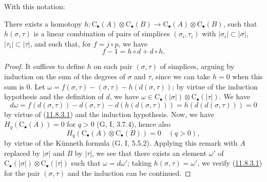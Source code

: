 With this notation:
\begin{proposition}[11.8.3]
\label{0.11.8.3}
{There exists a homotopy $h:\mathrm C_\bullet(A)\otimes\mathrm C_\bullet(B)\longrightarrow\mathrm C_\bullet(A)\otimes\mathrm C_\bullet(B)$,
such that $h(\sigma,\tau)$ is a linear combination of pairs of simplices
$(\sigma_i,\tau_i)$ with $|\sigma_i|\subset|\sigma|$,
$|\tau_i|\subset|\tau|$, and such that, for $f=j\circ p$, we have}
\[
\label{0.11.8.3.1}
\tag{11.8.3.1}
f-1=h\circ d+d\circ h.
\]
\end{proposition}

\begin{proof}
It suffices to define $h$ on each pair $(\sigma,\tau)$ of simplices,
arguing by induction on the sum of the degrees of $\sigma$ and $\tau$, since
we can take $h=0$ when this sum is $0$. Let $\omega=f(\sigma,\tau)-(\sigma,\tau)-h(d(\sigma,\tau))$;
by virtue of the induction hypothesis and the definition of $d$, we have $\omega\in\mathrm C_\bullet(|\sigma|)\otimes\mathrm C_\bullet(|\tau|)$.
We have
\[
d\omega=f(d(\sigma,\tau))-d(\sigma,\tau)-d(h(d(\sigma,\tau)))
=h(d(d(\sigma,\tau)))=0
\]
by virtue of (\hyperref[0.11.8.3.1]{11.8.3.1}) and the induction
hypothesis. Now, we have
$H_q(\mathrm C_\bullet(A))=0$ for $q>0$ (G, I, 3.7.4), hence also
\[
H_q(\mathrm C_\bullet(A)\otimes\mathrm C_\bullet(B))=0\quad(q>0),
\]
by virtue of the Künneth formula (G, I, 5.5.2). Applying this remark with
$A$ replaced by $|\sigma|$ and $B$ by $|\tau|$, we see that there exists an
element $\omega'$ of $\mathrm C_\bullet(|\sigma|)\otimes\mathrm C_\bullet(|\tau|)$
such that $\omega=d\omega'$; taking $h(\sigma,\tau)=\omega'$, we verify
(\hyperref[0.11.8.3.1]{11.8.3.1}) for the pair $(\sigma,\tau)$ and the
induction can be continued.
\end{proof}

